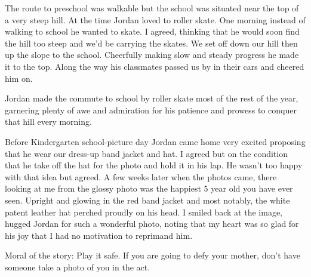 \documentclass{article}
\date{September 14, 2013}
\begin{document}
\maketitle

\begin{multicols}{3}
    The route to preschool was walkable but the school was situated near the
    top of a very steep hill. At the time Jordan loved to roller skate. One
    morning instead of walking to school he wanted to skate. I agreed, thinking
    that he would soon find the hill too steep and we'd be carrying the skates.
    We set off down our hill then up the slope to the school. Cheerfully making
    slow and steady progress he made it to the top. Along the way his
    classmates passed us by in their cars and cheered him on.

    Jordan made the commute to school by roller skate most of the rest of the
    year, garnering plenty of awe and admiration for his patience and prowess
    to conquer that hill every morning.
    \closearticle

    Before Kindergarten school-picture day Jordan came home very excited
    proposing that he wear our dress-up band jacket and hat. I agreed but on
    the condition that he take off the hat for the photo and hold it in his
    lap. He wasn't too happy with that idea but agreed. A few weeks later when
    the photos came, there looking at me from the glossy photo was the happiest
    5 year old you have ever seen. Upright and glowing in the red band jacket
    and most notably, the white patent leather hat perched proudly on his head.
    I smiled back at the image, hugged Jordan for such a wonderful photo,
    noting that my heart was so glad for his joy that I had no motivation to
    reprimand him.

    Moral of the story: Play it safe. If you are going to defy your mother,
    don't have someone take a photo of you in the act.
 
    \columnbreak
    

    \columnbreak
    
\end{multicols}
\pagebreak
\end{document}
